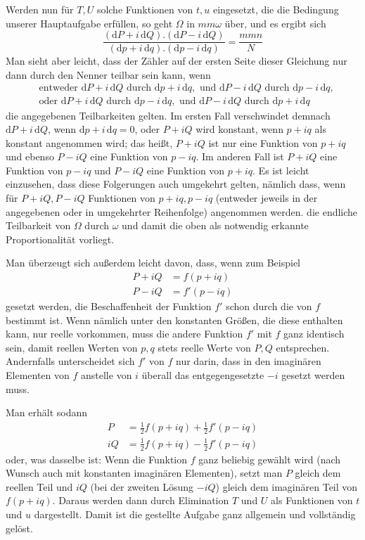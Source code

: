 Werden nun für \(T,U\) solche Funktionen von \(t,u\) eingesetzt, die die Bedingung unserer Hauptaufgabe erfüllen, so geht \(\Omega\) in \(mm\omega\) über, und es ergibt sich
\[
\frac{(\mathrm{d}P+i\,\mathrm{d}Q)\mathord{.}(\mathrm{d}P-i\,\mathrm{d}Q)}{(\mathrm{d}p+i\,\mathrm{d}q)\mathord{.}(\mathrm{d}p-i\,\mathrm{d}q)}=\frac{mmn}{N}
\]
\noindent Man sieht aber leicht, dass der Zähler auf der ersten Seite dieser Gleichung nur dann durch den Nenner teilbar sein kann, wenn
\[
\begin{aligned}
&\text{entweder }\mathrm{d}P+i\,\mathrm{d}Q\text{ durch }\mathrm{d}p+i\,\mathrm{d}q,\text{ und }\mathrm{d}P-i\,\mathrm{d}Q\text{ durch }\mathrm{d}p-i\,\mathrm{d}q,\\
&\text{oder }\mathrm{d}P+i\,\mathrm{d}Q\text{ durch }\mathrm{d}p-i\,\mathrm{d}q,\text{ und }\mathrm{d}P-i\,\mathrm{d}Q\text{ durch }\mathrm{d}p+i\,\mathrm{d}q
\end{aligned}
\]
\noindent die angegebenen Teilbarkeiten gelten. Im ersten Fall verschwindet demnach \(\mathrm{d}P+i\,\mathrm{d}Q\), wenn \(\mathrm{d}p+i\,\mathrm{d}q=0\), oder \(P+iQ\) wird konstant, wenn \(p+iq\) als konstant angenommen wird; das heißt, \(P+iQ\) ist nur eine Funktion von \(p+iq\) und ebenso \(P-iQ\) eine Funktion von \(p-iq\). Im anderen Fall ist \(P+iQ\) eine Funktion von \(p-iq\) und \(P-iQ\) eine Funktion von \(p+iq\). Es ist leicht einzusehen, dass diese Folgerungen auch umgekehrt gelten, nämlich dass, wenn für \(P+iQ,P-iQ\) Funktionen von \(p+iq,p-iq\) (entweder jeweils in der angegebenen oder in umgekehrter Reihenfolge) angenommen werden. die endliche Teilbarkeit von \(\Omega\) durch \(\omega\) und damit die oben als notwendig erkannte Proportionalität vorliegt.

Man überzeugt sich außerdem leicht davon, dass, wenn zum Beispiel
\[
\begin{aligned}
P+iQ&=f(p+iq)\\
P-iQ&=f'(p-iq)
\end{aligned}
\]
\noindent gesetzt werden, die Beschaffenheit der Funktion \(f'\) schon durch die von \(f\) bestimmt ist. Wenn nämlich unter den konstanten Größen, die diese enthalten kann, nur reelle vorkommen, muss die andere Funktion \(f'\) mit \(f\) ganz identisch sein, damit reellen Werten von \(p,q\) stets reelle Werte von \(P,Q\) entsprechen. Andernfalls unterscheidet sich \(f'\) von \(f\) nur darin, dass in den imaginären Elementen von \(f\) anstelle von \(i\) überall das entgegengesetzte \(-i\) gesetzt werden muss.

Man erhält sodann
\[
\begin{aligned}
P&=\tfrac{1}{2}f(p+iq)+\tfrac{1}{2}f'(p-iq)\\
iQ&=\tfrac{1}{2}f(p+iq)-\tfrac{1}{2}f'(p-iq)
\end{aligned}
\]
\noindent oder, was dasselbe ist: Wenn die Funktion \(f\) ganz beliebig gewählt wird (nach Wunsch auch mit konstanten imaginären Elementen), setzt man \(P\) gleich dem reellen Teil und \(iQ\) (bei der zweiten Lösung \(-iQ\)) gleich dem imaginären Teil von \(f(p+iq)\). Daraus werden dann durch Elimination \(T\) und \(U\) als Funktionen von \(t\) und \(u\) dargestellt. Damit ist die gestellte Aufgabe ganz allgemein und vollständig gelöst.

